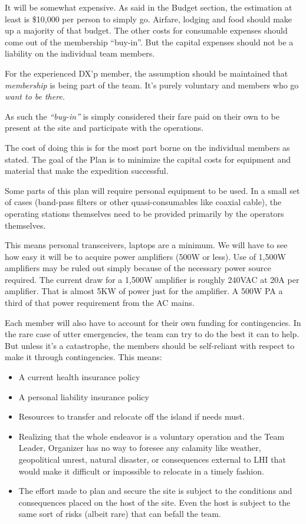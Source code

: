 \documentclass[11pt]{article}
\begin{document}
It will be somewhat expensive.  As said in the
Budget section, the estimation at least is \$10,000
per person to simply go.   Airfare, lodging and food
should make up a majority of that budget.  The other
costs for consumable expenses should come out of the
membership ``buy-in''.  But the capital expenses
should not be a liability on the individual team
members.  
\par
For the experienced DX'p member, the assumption
should be maintained that {\textit{membership}} is
being part of the team.   It's purely voluntary
and members who go {\textit{want to be there.}}
\par
As such the {\textit{``buy-in''}} is simply
considered their fare paid on their own to be
present at the site and participate with the operations.
\par
The cost of doing this is for the most part borne
on the individual members as stated.   The goal
of the Plan is to minimize the capital costs
for equipment and material that make the expedition
successful.
\par
Some parts of this plan will require personal
equipment to be used.   In a small set of cases
(band-pass filters or other quasi-consumables like
coaxial cable), the operating stations themselves need
to be provided primarily by the operators themselves.
\par
This means personal transceivers, laptops are a minimum.
We will have to see how easy it will be to acquire
power amplifiers (500W or less). Use of 1,500W amplifiers
may be ruled out simply because of the necessary power
source required.  The current draw for a 1,500W amplifier
is roughly 240VAC at 20A per amplifier.  That is almost
5KW of power just for the amplifier.   A 500W PA a third
of that power requirement from the AC mains.  
\par
Each member will also have to account for their own
funding for contingencies.   In the rare case of
utter emergencies, the team can try to do the best
it can to help.  But unless it's a catastrophe, the
members should be self-reliant with respect to make
it through contingencies.  This means:
\begin{itemize}
\item A current health insurance policy
\item A personal liability insurance policy
\item Resources to transfer and relocate off
the island if needs must.
\item Realizing that the whole endeavor is a voluntary
operation and the Team Leader, Organizer has no
way to foresee any calamity like weather, geopolitical
unrest, natural disaster, or consequences external
to LHI that would make it difficult or impossible
to relocate in a timely fashion.
\item The effort made to plan and secure the site
is subject to the conditions and consequences placed
on the host of the site.  Even the host is subject
to the same sort of risks (albeit rare) that can 
befall the team.
\end{itemize}
\end{document}
